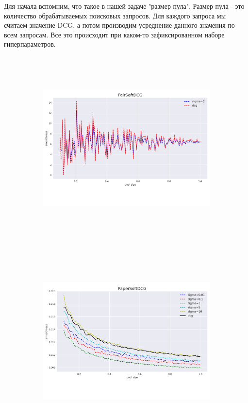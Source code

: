 \documentclass[14pt,a4paper]{amsart}
\theoremstyle{definition}
\theoremstyle{definition}
\begin{document}
Для начала вспомним, что такое в нашей задаче "размер пула". Размер пула - это количество обрабатываемых поисковых запросов. Для каждого запроса мы считаем значение DCG, а потом производим усреднение данного значения по всем запросам. Все это происходит при каком-то зафиксированном наборе гиперпараметров.\\

\begin{figure}[!h]
    \centering
    \begin{subfigure}{\textwidth}
    \centering
        \includegraphics[height=10cm, width=\textwidth]{fair_decrease_smoothness}
    \end{subfigure}
\end{figure}

\begin{figure}[!h]
    \centering
    \begin{subfigure}{\textwidth}
    \centering
        \includegraphics[height=10cm, width=\textwidth]{paper_decrease_smoothness}
     \end{subfigure}
\end{figure}
\end{document}
